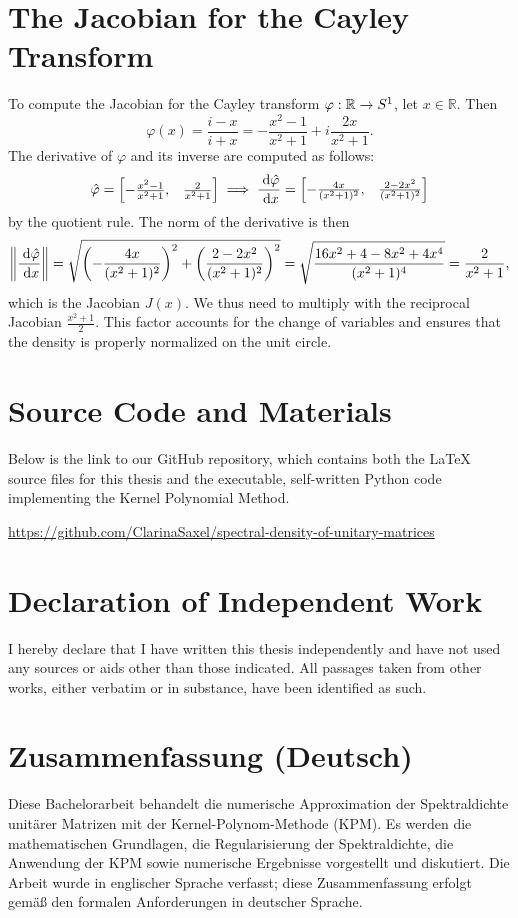 \section{The Jacobian for the Cayley Transform}

To compute the Jacobian for the Cayley transform $\varphi: \mathbb{R} \to S^1$, let $x \in \mathbb{R}$. Then
\[
\varphi(x) = \frac{i - x}{i + x} = -\frac{x^2 - 1}{x^2 + 1} + i \frac{2x}{x^2 + 1}.
\]
The derivative of $\varphi$ and its inverse are computed as follows:
\[
\hat{\varphi} =
\begin{bmatrix}
    -\frac{x^2 - 1}{x^2 + 1}, & \frac{2}{x^2 + 1} \\
\end{bmatrix}
\implies \frac{\;\mathrm{d}\hat{\varphi}}{\;\mathrm{d}x} =
\begin{bmatrix}
    -\frac{4x}{(x^2 + 1)^2}, & \frac{2 - 2x^2}{(x^2 + 1)^2} \\
\end{bmatrix}
\]
by the quotient rule. The norm of the derivative is then
\[
\left \| \frac{\;\mathrm{d}\hat{\varphi}}{\;\mathrm{d}x} \right \| = \sqrt{\left(-\frac{4x}{(x^2 + 1)^2}\right)^2 + \left(\frac{2 - 2x^2}{(x^2 + 1)^2}\right)^2} = \sqrt{\frac{16x^2 + 4 - 8x^2 + 4x^4}{(x^2 + 1)^4}} = \frac{2}{x^2 + 1},
\]
which is the Jacobian $J(x)$. We thus need to multiply with the reciprocal Jacobian $\frac{x^2 + 1}{2}$. This factor accounts for the change of variables and ensures that the density is properly normalized on the unit circle.

\section{Source Code and Materials}
Below is the link to our GitHub repository, which contains both the LaTeX source files for this thesis and the executable, self-written Python code implementing the Kernel Polynomial Method.

\noindent
\url{https://github.com/ClarinaSaxel/spectral-density-of-unitary-matrices}

\section{Declaration of Independent Work}
I hereby declare that I have written this thesis independently and have not used any sources or aids other than those indicated. All passages taken from other works, either verbatim or in substance, have been identified as such.

\section{Zusammenfassung (Deutsch)}
Diese Bachelorarbeit behandelt die numerische Approximation der Spektraldichte unitärer Matrizen mit der Kernel-Polynom-Methode (KPM). Es werden die mathematischen Grundlagen, die Regularisierung der Spektraldichte, die Anwendung der KPM sowie numerische Ergebnisse vorgestellt und diskutiert. Die Arbeit wurde in englischer Sprache verfasst; diese Zusammenfassung erfolgt gemäß den formalen Anforderungen in deutscher Sprache.